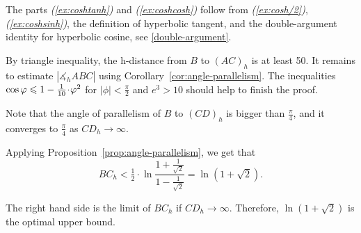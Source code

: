 The parts \textit{(\ref{ex:coshtanh})} and \textit{(\ref{ex:coshcosh})} follow from \textit{(\ref{ex:cosh/2})}, \textit{(\ref{ex:coshsinh})}, the definition of hyperbolic tangent, and the double-argument identity for hyperbolic cosine, see \ref{double-argument}.

\setcounter{eqtn}{0}

By triangle inequality, the h-distance from $B$ to $(AC)_h$ is at least 50.
It remains to estimate $|\measuredangle_h ABC|$ using Corollary~\ref{cor:angle-parallelism}.
The inequalities $\cos\phi\z\le 1-\tfrac1{10}\cdot\phi^2$ for $|\phi|<\tfrac\pi2$ and $e^3>10$ should help to finish the proof.

Note that the angle of parallelism of $B$ to $(CD)_h$ is bigger than $\tfrac\pi4$,
and it converges to $\tfrac\pi4$ as $CD_h\to\infty$.

Applying Proposition~\ref{prop:angle-parallelism},
we get that
$$BC_h<\tfrac12\cdot\ln\frac{1+\frac1{\sqrt{2}}}{1-\frac1{\sqrt{2}}}=\ln\left(1+\sqrt{2}\right).$$

The right hand side is the limit of $BC_h$ if $CD_h\to\infty$.
Therefore, $\ln\left(1+\sqrt{2}\right)$ is the optimal upper bound.

